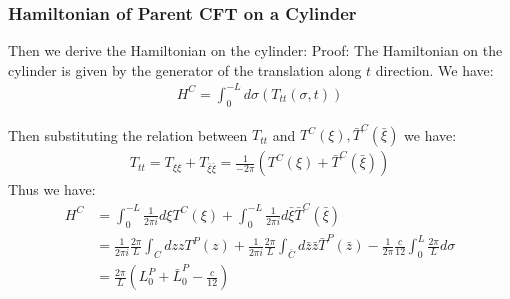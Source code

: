 
\subsubsection{Hamiltonian of Parent CFT on a
Cylinder}\label{sec:Hamiltonian of Parent CFT on a Cylinder}

Then we derive the Hamiltonian on the cylinder:
Proof: The Hamiltonian on the cylinder is given by the generator of
the translation along $ t $ direction. We have:
\begin{align}
  H^C = \int_{0}^{-L} d\sigma \left( T_{tt}(\sigma,t) \right)
\end{align}

Then substituting the relation between $ T_{tt} $ and $ T^C(\xi),
\bar{T}^C(\bar{\xi}) $ we have:
\begin{align}
  T_{tt} = T_{\xi\xi} + T_{\bar{\xi}\bar{\xi}} =
  \displaystyle\frac{1}{-2 \pi}(T^C(\xi) + \bar{T}^C(\bar{\xi}))
\end{align}
Thus we have:
\begin{align}
  H^C& = \int_{0}^{-L} \displaystyle\frac{1}{2 \pi i}  d\xi T^C(\xi)
  +  \int_0^{-L} \displaystyle\frac{1}{2 \pi i}  d
  \bar{\xi}\bar{T}^C(\bar{\xi}) \\
  &= \displaystyle\frac{1}{2 \pi i} \displaystyle\frac{2 \pi}{L}
  \int_{C} dz z T^P(z) +  \displaystyle\frac{1}{2 \pi i}
  \displaystyle\frac{2 \pi}{L}\int_{\bar{C}} d\bar{z} \bar{z}
  \bar{T}^P(\bar{z}) - \displaystyle\frac{1}{2 \pi}\frac{c}{12}
  \int_{0}^{L} \displaystyle\frac{2 \pi}{L}d\sigma \\
  &= \frac{2\pi}{L} \left( L_0^P + \bar{L}_0^P - \frac{c}{12} \right)
\end{align}

